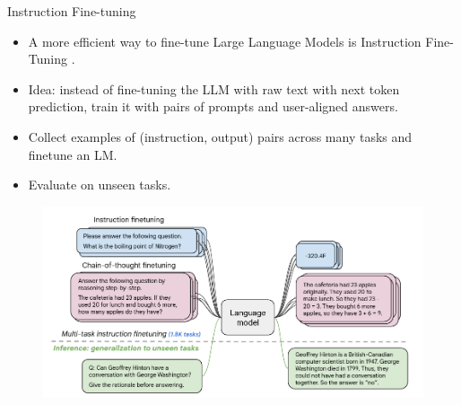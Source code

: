 \documentclass[handout]{beamer}
\begin{document}
\begin{frame}{Instruction Fine-tuning}

\begin{scriptsize}
\begin{itemize}
\item A more efficient way to fine-tune Large Language Models is Instruction Fine-Tuning  \cite{chung2022scaling}.
\item Idea: instead of fine-tuning the LLM with raw text with next token prediction, train it with pairs of prompts and user-aligned answers.
\item Collect examples of (instruction, output) pairs across many tasks and finetune an LM.
\item Evaluate on unseen tasks.
\end{itemize}

\begin{figure}[h]
	\includegraphics[scale = 0.35]{pics/instructionfinetuning.png}
\end{figure}


\end{scriptsize}






\end{frame}





\end{document}
